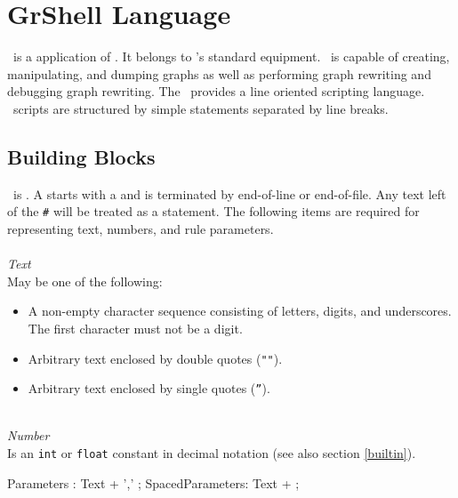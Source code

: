 \chapter{GrShell Language}
\label{chapgrshell}

\GrShell\ is a  application of \LibGr{}. 
It belongs to \GrG's standard equipment. \GrShell\ is capable of creating, manipulating, and dumping graphs as well as performing graph rewriting and debugging graph rewriting.
The \GrShell\ provides a line oriented scripting language. 
\GrShell\ scripts are structured by simple statements separated by line breaks.

\section{Building Blocks}

\GrShell\ is . 
A  starts with a \indexed{\texttt{\#}} and is terminated by end-of-line or end-of-file. 
Any text left of the \texttt{\#} will be treated as a statement.
The following items are required for representing text, numbers, and rule parameters.\\
\\
\emph{Text}\\
May be one of the following:
\begin{itemize}
  \item A non-empty character sequence consisting of letters, digits, and underscores. The first character must not be a digit.
  \item Arbitrary text enclosed by double quotes (\texttt{""}).
  \item Arbitrary text enclosed by single quotes (\texttt{''}).
\end{itemize}
\mbox{ }\\
\emph{Number}\\
Is an \texttt{int} or \texttt{float} constant in decimal notation (see also section \ref{builtin}).

\begin{rail} 
 Parameters : Text + ',' ;
 SpacedParameters: Text + ; 
\end{rail}

